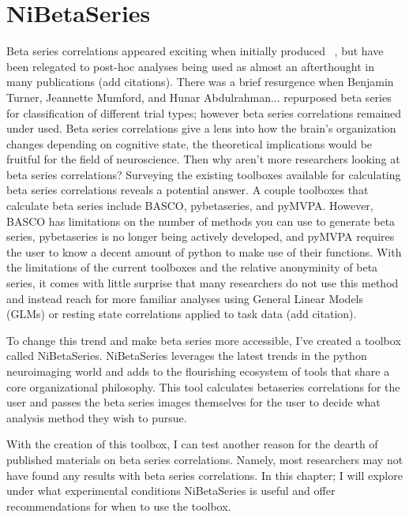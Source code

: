 \documentclass[phd,appendix,figures]{uithesis}
\begin{document}
\chapter{NiBetaSeries}

Beta series correlations appeared exciting when initially produced ~\citep{Rissman2004},
but have been relegated to post-hoc analyses being used as almost an afterthought in many
publications (add citations).
There was a brief resurgence when Benjamin Turner, Jeannette Mumford, and Hunar Abdulrahman... repurposed
beta series for classification of different trial types; however beta series correlations
remained under used.
Beta series correlations give a lens into how the brain's organization changes depending
on cognitive state, the theoretical implications would be fruitful for the field of neuroscience.
Then why aren't more researchers looking at beta series correlations?
Surveying the existing toolboxes available for calculating beta series correlations reveals a
potential answer.
A couple toolboxes that calculate beta series include BASCO, pybetaseries, and pyMVPA.
However, BASCO has limitations on the number of methods you can use to generate beta series,
pybetaseries is no longer being actively developed, and pyMVPA requires the user to know
a decent amount of python to make use of their functions.
With the limitations of the current toolboxes and the relative anonyminity of beta series,
it comes with little surprise that many researchers do not use this method and instead reach for
more familiar analyses using General Linear Models (GLMs) or resting state correlations applied
to task data (add citation).

To change this trend and make beta series more accessible, I've created a toolbox called NiBetaSeries.
NiBetaSeries leverages the latest trends in the python neuroimaging world and adds to the flourishing
ecosystem of tools that share a core organizational philosophy.
This tool calculates betaseries correlations for the user and passes the beta series images themselves
for the user to decide what analysis method they wish to pursue.

With the creation of this toolbox, I can test another reason for the dearth of published materials on
beta series correlations.
Namely, most researchers may not have found any results with beta series correlations.
In this chapter; I will explore under what experimental conditions NiBetaSeries is useful and offer
recommendations for when to use the toolbox.
\end{document}
